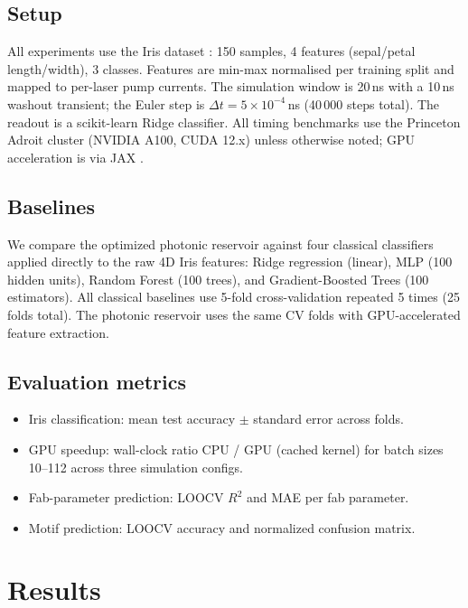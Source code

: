 \documentclass{article}
\begin{document}
\subsection{Setup}
All experiments use the Iris dataset \citep{fisher1936use}: 150 samples,
4 features (sepal/petal length/width), 3 classes.
Features are min-max normalised per training split and mapped to per-laser
pump currents.
The simulation window is 20\,ns with a 10\,ns washout transient;
the Euler step is $\Delta t = 5 \times 10^{-4}$\,ns (40\,000 steps total).
The readout is a scikit-learn \citep{scikit-learn} Ridge classifier.
All timing benchmarks use the Princeton Adroit cluster (NVIDIA A100, CUDA 12.x)
unless otherwise noted; GPU acceleration is via JAX \citep{bradbury2018jax}.

\subsection{Baselines}
We compare the optimized photonic reservoir against four classical classifiers
applied directly to the raw 4D Iris features:
Ridge regression (linear), MLP (100 hidden units), Random Forest (100 trees),
and Gradient-Boosted Trees (100 estimators).
All classical baselines use 5-fold cross-validation repeated 5 times (25 folds total).
The photonic reservoir uses the same CV folds with GPU-accelerated feature
extraction.

\subsection{Evaluation metrics}
\begin{itemize}
  \item Iris classification: mean test accuracy $\pm$ standard error across folds.
  \item GPU speedup: wall-clock ratio CPU / GPU (cached kernel) for batch sizes
        10--112 across three simulation configs.
  \item Fab-parameter prediction: LOOCV $R^2$ and MAE per fab parameter.
  \item Motif prediction: LOOCV accuracy and normalized confusion matrix.
\end{itemize}

\section{Results}
\label{sec:results}
\end{document}
